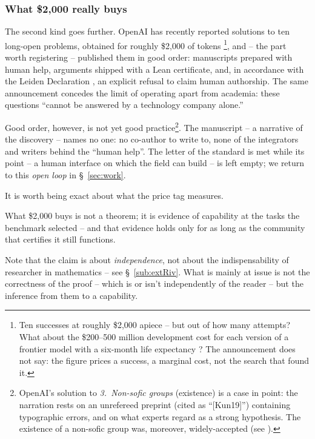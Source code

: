 \documentclass[11pt, a4paper,twosided]{amsart}
\begin{document}
\subsubsection{What \$2{,}000 really buys}\label{sec:buys}
  The second kind goes further. OpenAI has recently reported solutions to ten long-open problems, obtained for roughly \$2{,}000 of tokens \cite{openai2026}\footnote{Ten successes at roughly \$2{,}000 apiece -- but out of how many attempts? What about the \$200--500 million development cost for each version of a frontier model with a six-month life expectancy \cite{SCH26}? The announcement does not say: the figure prices a success, a marginal cost, not the search that found it.}, and -- the part worth registering -- published them in good order: manuscripts prepared with human help, arguments shipped with a Lean certificate, and, in accordance with the Leiden Declaration \cite{leiden2026}, an explicit refusal to claim human authorship. The same announcement concedes the limit of operating apart from academia: these questions ``cannot be answered by a technology company alone.''

  Good order, however, is not yet good practice\footnote{OpenAI's solution to \emph{3.~Non-sofic groups} (existence) is a case in point: the narration rests on an unrefereed preprint (cited as ``[Kun19]'') containing typographic errors, and on what experts regard as a strong hypothesis. The existence of a non-sofic group was, moreover, widely-accepted (see \cite{FFF26}).\label{ft:OAI3}}. The manuscript -- a narrative of the discovery -- names no one: no co-author to write to, none of the integrators and writers behind the ``human help''. The letter of the standard is met while its point -- a human interface on which the field can build -- is left empty; we return to this \emph{open loop} in \S~\ref{sec:work}.

  It is worth being exact about what the price tag measures. 
  
  \begin{pullquote}
    What \$2{,}000 buys is not a theorem; it is evidence of capability at the tasks the benchmark selected -- and that evidence holds only for as long as the community that certifies it still functions.
  \end{pullquote}
  Note that the claim is about \emph{independence}, not about the indispensability of researcher in mathematics -- see \S~\ref{sub:extRiv}. What is mainly at issue is not the correctness of the proof -- which is or isn't independently of the reader -- but the inference from them to a capability.
\end{document}
